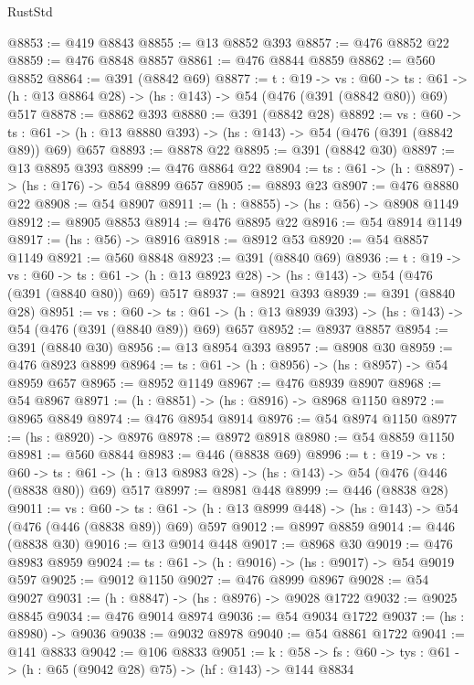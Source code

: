 \begin{lexlean}{RustStd}
\begin{coremodule}
@8853 := @419 @8843
@8855 := @13 @8852 @393
@8857 := @476 @8852 @22
@8859 := @476 @8848 @8857
@8861 := @476 @8844 @8859
@8862 := @560 @8852
@8864 := @391 (@8842 @69)
@8877 := {t : @19} ->
  {vs : @60} ->
  {ts : @61} -> (h : @13 @8864 @28) -> (hs : @143) -> @54 (@476 (@391 (@8842 @80)) @69) @517
@8878 := @8862 @393
@8880 := @391 (@8842 @28)
@8892 := {vs : @60} ->
  {ts : @61} -> (h : @13 @8880 @393) -> (hs : @143) -> @54 (@476 (@391 (@8842 @89)) @69) @657
@8893 := @8878 @22
@8895 := @391 (@8842 @30)
@8897 := @13 @8895 @393
@8899 := @476 @8864 @22
@8904 := {ts : @61} -> (h : @8897) -> (hs : @176) -> @54 @8899 @657
@8905 := @8893 @23
@8907 := @476 @8880 @22
@8908 := @54 @8907
@8911 := (h : @8855) -> (hs : @56) -> @8908 @1149
@8912 := @8905 @8853
@8914 := @476 @8895 @22
@8916 := @54 @8914 @1149
@8917 := (hs : @56) -> @8916
@8918 := @8912 @53
@8920 := @54 @8857 @1149
@8921 := @560 @8848
@8923 := @391 (@8840 @69)
@8936 := {t : @19} ->
  {vs : @60} ->
  {ts : @61} -> (h : @13 @8923 @28) -> (hs : @143) -> @54 (@476 (@391 (@8840 @80)) @69) @517
@8937 := @8921 @393
@8939 := @391 (@8840 @28)
@8951 := {vs : @60} ->
  {ts : @61} -> (h : @13 @8939 @393) -> (hs : @143) -> @54 (@476 (@391 (@8840 @89)) @69) @657
@8952 := @8937 @8857
@8954 := @391 (@8840 @30)
@8956 := @13 @8954 @393
@8957 := @8908 @30
@8959 := @476 @8923 @8899
@8964 := {ts : @61} -> (h : @8956) -> (hs : @8957) -> @54 @8959 @657
@8965 := @8952 @1149
@8967 := @476 @8939 @8907
@8968 := @54 @8967
@8971 := (h : @8851) -> (hs : @8916) -> @8968 @1150
@8972 := @8965 @8849
@8974 := @476 @8954 @8914
@8976 := @54 @8974 @1150
@8977 := (hs : @8920) -> @8976
@8978 := @8972 @8918
@8980 := @54 @8859 @1150
@8981 := @560 @8844
@8983 := @446 (@8838 @69)
@8996 := {t : @19} ->
  {vs : @60} ->
  {ts : @61} -> (h : @13 @8983 @28) -> (hs : @143) -> @54 (@476 (@446 (@8838 @80)) @69) @517
@8997 := @8981 @448
@8999 := @446 (@8838 @28)
@9011 := {vs : @60} ->
  {ts : @61} -> (h : @13 @8999 @448) -> (hs : @143) -> @54 (@476 (@446 (@8838 @89)) @69) @597
@9012 := @8997 @8859
@9014 := @446 (@8838 @30)
@9016 := @13 @9014 @448
@9017 := @8968 @30
@9019 := @476 @8983 @8959
@9024 := {ts : @61} -> (h : @9016) -> (hs : @9017) -> @54 @9019 @597
@9025 := @9012 @1150
@9027 := @476 @8999 @8967
@9028 := @54 @9027
@9031 := (h : @8847) -> (hs : @8976) -> @9028 @1722
@9032 := @9025 @8845
@9034 := @476 @9014 @8974
@9036 := @54 @9034 @1722
@9037 := (hs : @8980) -> @9036
@9038 := @9032 @8978
@9040 := @54 @8861 @1722
@9041 := @141 @8833
@9042 := @106 @8833
@9051 := {k : @58} ->
  {fs : @60} -> {tys : @61} -> (h : @65 (@9042 @28) @75) -> (hf : @143) -> @144 @8834

\end{coremodule}
\end{lexlean}
